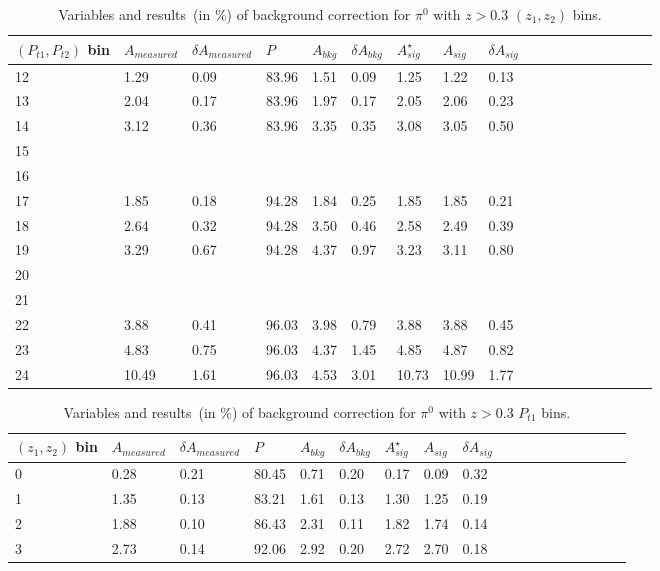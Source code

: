 \begin{table}[H]\footnotesize
\centering
\begin{tabular}{|l|l|l|l|l|l|l|l|l|l|l|l|l|l|l|l|l|l|}
\\ \hline
$(P_{t1},P_{t2})$ bin & $A_{measured}$ & $\delta A_{measured}$ & $P$ & $A_{bkg}$ & $\delta A_{bkg}$ & $A_{sig}^{\star}$ & $ A_{sig}$  & $\delta A_{sig}$ \\ \hline
12 & 1.29 & 0.09 & 83.96 & 1.51 & 0.09 & 1.25 & 1.22 & 0.13 \\ \hline 
13 & 2.04 & 0.17 & 83.96 & 1.97 & 0.17 & 2.05 & 2.06 & 0.23 \\ \hline 
14 & 3.12 & 0.36 & 83.96 & 3.35 & 0.35 & 3.08 & 3.05 & 0.50 \\ \hline 
15 &  &  &  &  &  &  &  &  \\ \hline 
16 & &  &  &  &  &  &  &  &  \\ \hline  
17 & 1.85 & 0.18 & 94.28 & 1.84 & 0.25 & 1.85 & 1.85 & 0.21 \\ \hline 
18 & 2.64 & 0.32 & 94.28 & 3.50 & 0.46 & 2.58 & 2.49 & 0.39 \\ \hline 
19 & 3.29 & 0.67 & 94.28 & 4.37 & 0.97 & 3.23 & 3.11 & 0.80 \\ \hline 
20 & &  &  &  &  &  &  &  &  \\ \hline  
21 & &  &  &  &  &  &  &  &  \\ \hline 
22 & 3.88 & 0.41 & 96.03 & 3.98 & 0.79 & 3.88 & 3.88 & 0.45 \\ \hline 
23 & 4.83 & 0.75 & 96.03 & 4.37 & 1.45 & 4.85 & 4.87 & 0.82 \\ \hline 
24 & 10.49 & 1.61 & 96.03 & 4.53 & 3.01 & 10.73 & 10.99 & 1.77 \\ \hline 
 \end{tabular}
\caption{Variables and results~(in $\%$) of background correction for $\pi^0$ with $z>0.3$ $(z_1,z_2)$ bins. }
\label{tab:pi0comzbkgcor}
\end{table} 

\begin{table}[H]\footnotesize
\centering
\begin{tabular}{|l|l|l|l|l|l|l|l|l|l|l|l|l|l|l|l|l|l|}
\\ \hline
$(z_1,z_2)$ bin & $A_{measured}$ & $\delta A_{measured}$ & $P$  & $A_{bkg}$ & $\delta A_{bkg}$ & $A_{sig}^{\star}$ & $ A_{sig}$  & $\delta A_{sig}$ \\ \hline
0 & 0.28 & 0.21 & 80.45 & 0.71 & 0.20 & 0.17 & 0.09 & 0.32 \\ \hline 
1 & 1.35 & 0.13 & 83.21 & 1.61 & 0.13 & 1.30 & 1.25 & 0.19 \\ \hline 
2 & 1.88 & 0.10 & 86.43 & 2.31 & 0.11 & 1.82 & 1.74 & 0.14 \\ \hline 
3 & 2.73 & 0.14 & 92.06 & 2.92 & 0.20 & 2.72 & 2.70 & 0.18 \\ \hline 
\end{tabular}
\caption{Variables and results~(in $\%$) of background correction for $\pi^0$ with $z>0.3$ $P_{t1}$ bins. }
\label{tab:pi0sinptbkgcor}
\end{table}

